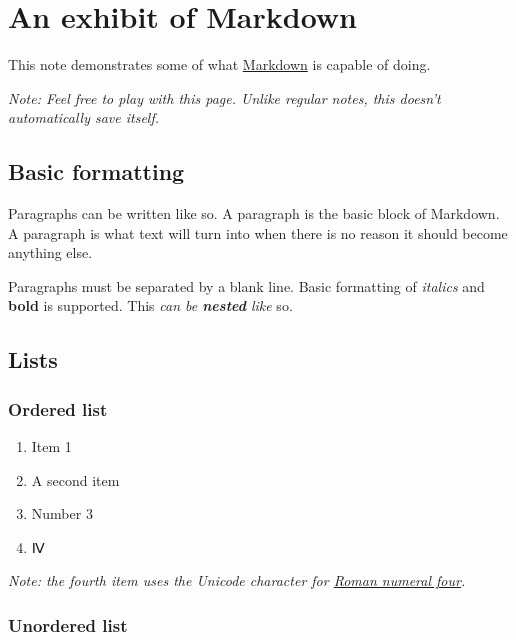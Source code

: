 \hypertarget{an-exhibit-of-markdown}{%
\section{An exhibit of Markdown}\label{an-exhibit-of-markdown}}

This note demonstrates some of what
\href{http://daringfireball.net/projects/markdown/}{Markdown} is capable
of doing.

\emph{Note: Feel free to play with this page. Unlike regular notes, this
doesn't automatically save itself.}

\hypertarget{basic-formatting}{%
\subsection{Basic formatting}\label{basic-formatting}}

Paragraphs can be written like so. A paragraph is the basic block of
Markdown. A paragraph is what text will turn into when there is no
reason it should become anything else.

Paragraphs must be separated by a blank line. Basic formatting of
\emph{italics} and \textbf{bold} is supported. This \emph{can be
\textbf{nested} like} so.

\hypertarget{lists}{%
\subsection{Lists}\label{lists}}

\hypertarget{ordered-list}{%
\subsubsection{Ordered list}\label{ordered-list}}

\begin{enumerate}
\def\labelenumi{\arabic{enumi}.}
\tightlist
\item
  Item 1
\item
  A second item
\item
  Number 3
\item
  Ⅳ
\end{enumerate}

\emph{Note: the fourth item uses the Unicode character for
\href{http://www.fileformat.info/info/unicode/char/2163/index.htm}{Roman
numeral four}.}

\hypertarget{unordered-list}{%
\subsubsection{Unordered list}\label{unordered-list}}


